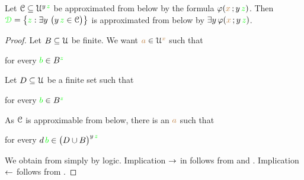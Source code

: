 % 
% 
% 
% 
% 
% 
% 
% 
% 

\begin{proposition}\label{prop_sh_exp_qe}
Let $\EuScript C\subseteq\EuScript U^{y\,{\color{green} z}}$ be approximated from below by the formula $\varphi({\color{brown} x}\,;y\,{\color{green} z})$.
Then ${\color{green}\EuScript D}=\big\{{\color{green} z}:\exists y\ \big(y\,{\color{green} z}\in\EuScript C\big)\big\}$ is approximated from below by $\exists y\,\varphi({\color{brown} x}\,;y\,{\color{green} z})$.
\end{proposition}

\begin{proof}
Let $B\subseteq\EuScript U$ be finite.
We want ${\color{brown} a}\in\EuScript U^{\color{brown} x}$ such that

\hfill for every ${\color{green} b}\in B^{\color{green} z}$


Let $D\subseteq\EuScript U$ be a finite set such that 

\hfill for every ${\color{green} b}\in B^{\color{green} z}$

As $\EuScript C$ is approximable from below, there is an ${\color{brown} a}$ such that

\hfill for every $d\,{\color{green} b}\in \big(D\cup B\big)^{y\,{\color{green} z}}$


We obtain  from  simply by logic. 
Implication $\rightarrow$ in  follows from  and . 
Implication $\leftarrow$ follows from .
\end{proof}

